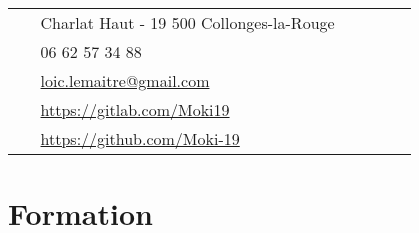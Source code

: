 \documentclass[10pt]{article} %
\begin{document}
\begin{paracol}{2}
  \parbox[top][0.12\textheight][c]{\linewidth}{ %
    \vspace{-0.04\textheight} %
    \colorbox{shade}{ %
      \begin{supertabular}{p{0.05\linewidth}|p{0.775\linewidth}} %
        \raisebox{-1pt}{\faHome} & Charlat Haut - 19 500 Collonges-la-Rouge \\ %
        \raisebox{-1pt}{\faPhone} & 06 62 57 34 88 \\ %
        \raisebox{0pt}{\small\faEnvelope} & \href{mailto:loic.lemaitre@gmail.com}{loic.lemaitre@gmail.com} \\ %
        \raisebox{-1pt}{\small\faGitlab} & \href{https://gitlab.com/Moki19}{https://gitlab.com/Moki19} \\ %
        \raisebox{-1pt}{\small\faGithub} & \href{https://github.com/Moki-19}{https://github.com/Moki-19} \\ %
      \end{supertabular}
    }
  }


  \section{Formation}





\end{paracol}
\end{document}
